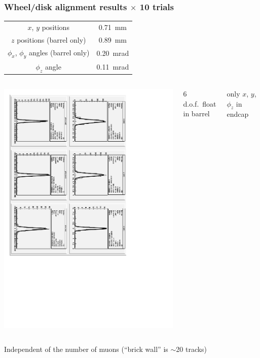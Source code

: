 \documentclass[compress]{beamer}
\begin{document}
\begin{frame}
\frametitle{Wheel/disk alignment results $\times$ 10 trials}
\hfill \begin{tabular}{c c}
$x$, $y$ positions & 0.71~mm \\
$z$ positions (barrel only) & 0.89~mm \\
$\phi_x$, $\phi_y$ angles (barrel only) & 0.20~mrad \\
$\phi_z$ angle & 0.11~mrad
\end{tabular}

\vfill
\begin{columns}
\includegraphics[height=0.9\linewidth, angle=90]{optimal_disk_alignment.pdf}

6 d.o.f.\ float in barrel

only $x$, $y$, $\phi_z$ in endcap
\end{columns}

\vfill
Independent of the number of muons (``brick wall'' is $\sim$20 tracks)
\end{frame}
\end{document}
